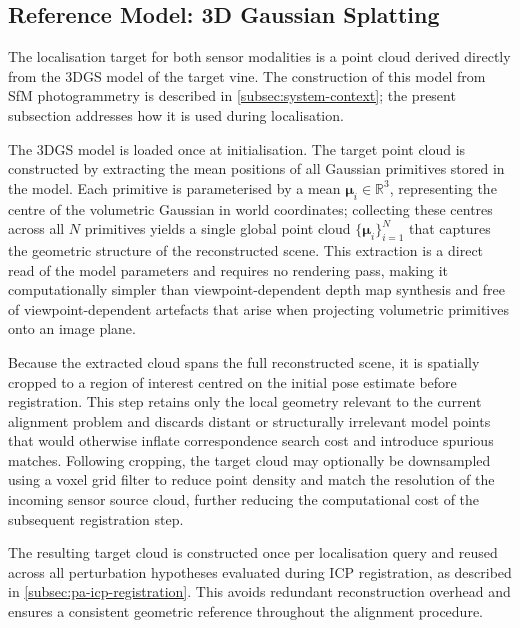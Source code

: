 \subsection{Reference Model: 3D Gaussian Splatting}
\label{subsec:pa-reference-model}

The localisation target for both sensor modalities is a point cloud derived directly from the 3DGS model of the target vine. The construction of this model from SfM photogrammetry is described in \cref{subsec:system-context}; the present subsection addresses how it is used during localisation.

The 3DGS model is loaded once at initialisation. The target point cloud is constructed by extracting the mean positions of all Gaussian primitives stored in the model. Each primitive is parameterised by a mean $\boldsymbol{\mu}_i \in \mathbb{R}^3$, representing the centre of the volumetric Gaussian in world coordinates; collecting these centres across all $N$ primitives yields a single global point cloud $\{\boldsymbol{\mu}_i\}_{i=1}^{N}$ that captures the geometric structure of the reconstructed scene. This extraction is a direct read of the model parameters and requires no rendering pass, making it computationally simpler than viewpoint-dependent depth map synthesis and free of viewpoint-dependent artefacts that arise when projecting volumetric primitives onto an image plane.

Because the extracted cloud spans the full reconstructed scene, it is spatially cropped to a region of interest centred on the initial pose estimate before registration. This step retains only the local geometry relevant to the current alignment problem and discards distant or structurally irrelevant model points that would otherwise inflate correspondence search cost and introduce spurious matches. Following cropping, the target cloud may optionally be downsampled using a voxel grid filter to reduce point density and match the resolution of the incoming sensor source cloud, further reducing the computational cost of the subsequent registration step.

The resulting target cloud is constructed once per localisation query and reused across all perturbation hypotheses evaluated during ICP registration, as described in \cref{subsec:pa-icp-registration}. This avoids redundant reconstruction overhead and ensures a consistent geometric reference throughout the alignment procedure.

